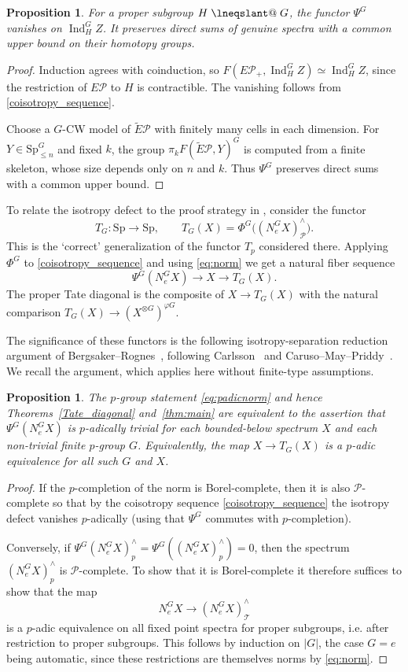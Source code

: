 \documentclass[11pt,a4paper]{article}
\makeatletter
\newtheorem{prop}[thm]{Proposition}
\theoremstyle{definition}
\newcommand{\Sp}{\mathrm{Sp}}
\newcommand{\SpG}{\mathrm{Sp}^{G}}
\newcommand{\Pp}{\mathcal P}
\newcommand{\Tt}{\mathcal T}
\newcommand{\EP}{E\mathcal P}
\newcommand{\tEP}{\widetilde E\mathcal P}
\newcommand{\Ind}{\operatorname{Ind}}
\newcommand{\NormG}{N_e^G}
\DeclareRobustCommand{\lneqslant}{%
  \mathrel{\mathpalette\lneqslant@{}}}
\newcommand{\lneqslant@}[2]{%
  \begingroup
  \setbox0=\hbox{$\m@th#1\leqslant$}%
  \ooalign{\copy0\cr
    \hidewidth\raisebox{-.10\wd0}[0pt][0pt]{%
      \rotatebox[origin=c]{55}{\rule{.42\wd0}{.05\wd0}}}%
    \hidewidth\cr}%
  \endgroup}
\makeatother
\begin{document}
\begin{prop}\label{prop:psi}
For a proper subgroup $H\lneqslant G$, the functor $\Psi^G$
vanishes on $\Ind_H^G Z$. It preserves direct sums of genuine
spectra with a common upper bound on their homotopy groups.
\end{prop}
\begin{proof}
Induction agrees with coinduction, so
$F(\EP_+,\Ind_H^G Z)\simeq\Ind_H^G Z$, since the restriction of
$\EP$ to $H$ is contractible. The vanishing follows from
\eqref{coisotropy_sequence}.

Choose a $G$-CW model of $\tEP$ with finitely many cells in each
dimension. For $Y\in\SpG_{\le n}$ and fixed $k$, the group
$\pi_k F(\tEP,Y)^G$ is computed from a finite skeleton, whose size
depends only on $n$ and $k$. Thus $\Psi^G$ preserves direct sums
with a common upper bound.
\end{proof}

To relate the isotropy defect to the proof strategy in
\cite[Section~III.1]{NS}, consider the functor
\[
 T_G:\Sp\longrightarrow\Sp,\qquad
 T_G(X)=\Phi^G\bigl((\NormG X)^\wedge_{\Pp}\bigr).
\]
This is the `correct' generalization of the functor $T_p$ considered there. 
Applying $\Phi^G$ to \eqref{coisotropy_sequence} and using \eqref{eq:norm} we get a
natural fiber sequence
\[
 \Psi^G(\NormG X)\longrightarrow X\longrightarrow T_G(X).
\]
The proper Tate diagonal is the composite of $X\to T_G(X)$ with
the natural comparison $T_G(X)\to(X^{\otimes G})^{\varphi G}$.

The significance of these functors is the  following isotropy-separation reduction argument of
Bergsaker--Rognes~\cite[Proposition~2.2]{BR}, following
Carlsson~\cite[Theorem~A(b)]{Car} and
Caruso--May--Priddy~\cite[Lemma~1.9]{CMP}.
We recall the argument, which applies here without finite-type assumptions.
\begin{prop}\label{prop:defecteq} The $p$-group statement \eqref{eq:padicnorm} and hence Theorems~\ref{Tate_diagonal} and~\ref{thm:main} are equivalent to the assertion that  $\Psi^G( \NormG X)$ is $p$-adically trivial  for each bounded-below spectrum $X$ and each non-trivial finite $p$-group $G$. Equivalently, the map $X\to T_G(X)$ is a $p$-adic equivalence for all such $G$ and $X$.
\end{prop}

\begin{proof}
If the $p$-completion of the norm is Borel-complete, then it is also $\Pp$-complete so that by the coisotropy sequence \eqref{coisotropy_sequence} the isotropy defect vanishes $p$-adically (using that $\Psi^G$ commutes with $p$-completion).

Conversely, if $\Psi^G(\NormG X)^\wedge_p = \Psi^G((\NormG X)^\wedge_p) = 0$, then the spectrum $(\NormG X)^\wedge_p$ is $\Pp$-complete. To show that it is Borel-complete it therefore suffices to show that the map
\[
\NormG X \to (\NormG X)^\wedge_{\Tt}
\]
is a $p$-adic equivalence on all fixed point spectra for proper subgroups, i.e. after restriction to proper subgroups.
This follows by induction on $|G|$, the case $G=e$ being automatic, since
these restrictions are themselves norms by \eqref{eq:norm}.
\end{proof}
\end{document}
